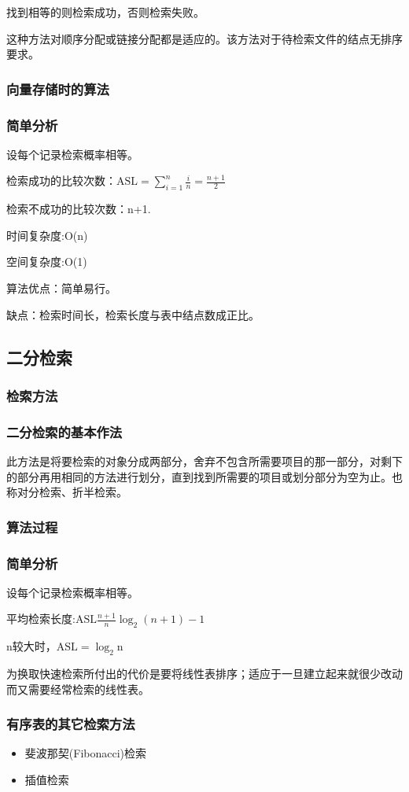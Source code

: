 \documentclass[AutoFakeBold]{LZUThesis2007}
\begin{document}
找到相等的则检索成功，否则检索失败。

这种方法对顺序分配或链接分配都是适应的。该方法对于待检索文件的结点无排序要求。
			\subsubsection{向量存储时的算法}
			\subsubsection{简单分析}
设每个记录检索概率相等。

检索成功的比较次数：$\mathrm{ASL}=\sum_{i=1}^{n} \frac{i}{n}=\frac{n+1}{2}$

检索不成功的比较次数：n+1.

时间复杂度:O(n)

空间复杂度:O(1)

算法优点：简单易行。

缺点：检索时间长，检索长度与表中结点数成正比。

		\subsection{二分检索}
			\subsubsection{检索方法}
			\subsubsection{二分检索的基本作法}
此方法是将要检索的对象分成两部分，舍弃不包含所需要项目的那一部分，对剩下的部分再用相同的方法进行划分，直到找到所需要的项目或划分部分为空为止。也称对分检索、折半检索。
			\subsubsection{算法过程}
			\subsubsection{简单分析}
设每个记录检索概率相等。

平均检索长度:$\mathrm{ASL}\frac{n+1}{n} \log _{2}(n+1)-1$

n较大时，$\mathrm{ASL}=\log _{2} \mathrm{n}$

为换取快速检索所付出的代价是要将线性表排序；适应于一旦建立起来就很少改动而又需要经常检索的线性表。
			\subsubsection{有序表的其它检索方法}
\begin{itemize}
	\item 斐波那契(Fibonacci)检索
	\item 插值检索
\end{itemize}
\end{document}

